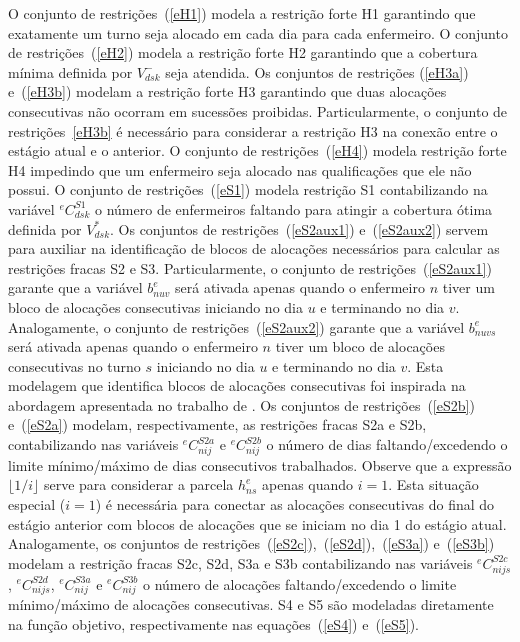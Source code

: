 \documentclass[cic,tc, twoside]{iiufrgs}
\begin{document}
O conjunto de restrições~(\ref{eH1}) modela a restrição forte H1 garantindo que exatamente um turno seja alocado em cada dia para cada enfermeiro.
O conjunto de restrições~(\ref{eH2}) modela a restrição forte H2 garantindo que a cobertura mínima definida por $V^-_{dsk}$ seja atendida.
Os conjuntos de restrições (\ref{eH3a}) e~(\ref{eH3b}) modelam a restrição forte H3 garantindo que duas alocações consecutivas não ocorram em sucessões proibidas. Particularmente, o conjunto de restrições~\ref{eH3b} é necessário para considerar a restrição H3 na conexão entre o estágio atual e o anterior.  
O conjunto de restrições~(\ref{eH4}) modela restrição forte H4 impedindo que um enfermeiro seja alocado nas qualificações que ele não possui.
O conjunto de restrições~(\ref{eS1}) modela restrição S1 contabilizando na variável $^eC^{S1}_{dsk}$ o número de enfermeiros faltando para atingir a cobertura ótima definida por $V^*_{dsk}$.
Os conjuntos de restrições~(\ref{eS2aux1}) e~(\ref{eS2aux2}) servem para auxiliar na identificação de blocos de alocações necessários para calcular as restrições fracas S2 e S3. Particularmente, o conjunto de restrições~(\ref{eS2aux1}) garante que a variável $b^e_{nuv}$ será ativada apenas quando o enfermeiro $n$ tiver um bloco de alocações consecutivas iniciando no dia $u$ e terminando no dia $v$. 
Analogamente, o conjunto de restrições~(\ref{eS2aux2}) garante que a variável $b^e_{nuvs}$ será ativada apenas quando o enfermeiro $n$ tiver um bloco de alocações consecutivas no turno $s$ iniciando no dia $u$ e terminando no dia $v$. Esta modelagem que identifica blocos de alocações consecutivas foi inspirada na abordagem apresentada no trabalho de \citet{dorneles2012impact}.
Os conjuntos de restrições~(\ref{eS2b}) e~(\ref{eS2a}) modelam, respectivamente, as restrições fracas S2a e S2b, contabilizando nas variáveis $^eC^{S2a}_{nij}$ e $^eC^{S2b}_{nij}$ o número de dias faltando/excedendo o limite mínimo/máximo de dias consecutivos trabalhados.
Observe que a expressão $\lfloor 1/i \rfloor$ serve para considerar a parcela $h^e_{ns}$ apenas quando $i=1$. Esta situação especial ($i=1$) é necessária para conectar as alocações consecutivas do final do estágio anterior com blocos de alocações que se iniciam no dia 1 do estágio atual.
Analogamente, os conjuntos de restrições~(\ref{eS2c}),~(\ref{eS2d}),~(\ref{eS3a}) e~(\ref{eS3b}) modelam a restrição fracas S2c, S2d, S3a e S3b contabilizando nas variáveis $^eC^{S2c}_{nijs}$, $^eC^{S2d}_{nijs}$, $^eC^{S3a}_{nij}$ e $^eC^{S3b}_{nij}$ o número de alocações faltando/excedendo o limite mínimo/máximo de alocações consecutivas.
S4 e S5 são modeladas diretamente na função objetivo, respectivamente nas equações~(\ref{eS4}) e~(\ref{eS5}).
\end{document}
